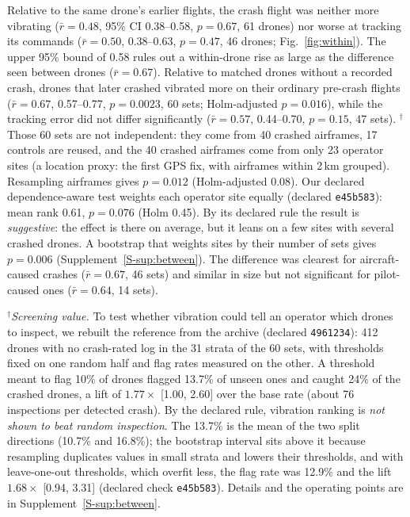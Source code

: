 \documentclass[preprint,12pt]{elsarticle}
\begin{document}
Relative to the same drone's earlier flights, the crash flight was neither more vibrating ($\bar r=0.48$, 95\% CI
0.38--0.58, $p=0.67$, 61 drones) nor worse at tracking its commands ($\bar r=0.50$, 0.38--0.63, $p=0.47$, 46 drones;
Fig.~\ref{fig:within}). The upper 95\% bound of 0.58 rules out a within-drone rise as large as the difference seen between drones ($\bar r=0.67$). Relative to matched
drones without a recorded crash, drones that later crashed vibrated more on their ordinary pre-crash flights ($\bar r=0.67$,
0.57--0.77, $p=0.0023$, 60 sets; Holm-adjusted $p=0.016$), while the tracking error did not differ significantly
($\bar r=0.57$, 0.44--0.70, $p=0.15$, 47 sets). $^\dagger$Those 60 sets are not independent: they come from 40 crashed airframes, 17 controls are reused, and the 40 crashed airframes come from only 23 operator sites (a location proxy: the first GPS fix, with airframes within 2\,km grouped). Resampling airframes gives $p=0.012$ (Holm-adjusted 0.08). Our declared dependence-aware test weights each operator site equally (declared \texttt{e45b583}): mean rank 0.61, $p=0.076$ (Holm 0.45). By its declared rule the result is \emph{suggestive}: the effect is there on average, but it leans on a few sites with several crashed drones. A bootstrap that weights sites by their number of sets gives $p=0.006$ (Supplement~\ref{S-sup:between}). The difference was clearest for aircraft-caused crashes ($\bar r=0.67$, 46 sets) and similar in size but not significant for pilot-caused ones ($\bar r=0.64$, 14 sets).

$^\dagger$\emph{Screening value.} To test whether vibration could tell an operator which drones to inspect, we rebuilt the reference from the archive (declared \texttt{4961234}): 412 drones with no crash-rated log in the 31 strata of the 60 sets, with thresholds fixed on one random half and flag rates measured on the other. A threshold meant to flag 10\% of drones flagged 13.7\% of unseen ones and caught 24\% of the crashed drones, a lift of $1.77\times$ [1.00, 2.60] over the base rate (about 76 inspections per detected crash). By the declared rule, vibration ranking is \emph{not shown to beat random inspection}. The 13.7\% is the mean of the two split directions (10.7\% and 16.8\%); the bootstrap interval sits above it because resampling duplicates values in small strata and lowers their thresholds, and with leave-one-out thresholds, which overfit less, the flag rate was 12.9\% and the lift $1.68\times$ [0.94, 3.31] (declared check \texttt{e45b583}). Details and the operating points are in Supplement~\ref{S-sup:between}.
\end{document}
